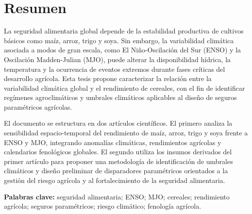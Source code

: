 \chapter*{Resumen}

La seguridad alimentaria global depende de la estabilidad productiva de cultivos básicos como maíz, arroz, trigo y soya. Sin embargo, la variabilidad climática asociada a modos de gran escala, como El Niño-Oscilación del Sur (ENSO) y la Oscilación Madden-Julian (MJO), puede alterar la disponibilidad hídrica, la temperatura y la ocurrencia de eventos extremos durante fases críticas del desarrollo agrícola. Esta tesis propone caracterizar la relación entre la variabilidad climática global y el rendimiento de cereales, con el fin de identificar regímenes agroclimáticos y umbrales climáticos aplicables al diseño de seguros paramétricos agrícolas.

El documento se estructura en dos artículos científicos. El primero analiza la sensibilidad espacio-temporal del rendimiento de maíz, arroz, trigo y soya frente a ENSO y MJO, integrando anomalías climáticas, rendimientos agrícolas y calendarios fenológicos globales. El segundo utiliza los insumos derivados del primer artículo para proponer una metodología de identificación de umbrales climáticos y diseño preliminar de disparadores paramétricos orientados a la gestión del riesgo agrícola y al fortalecimiento de la seguridad alimentaria.


\textbf{Palabras clave:} seguridad alimentaria; ENSO; MJO; cereales; rendimiento agrícola; seguros paramétricos; riesgo climático; fenología agrícola.
